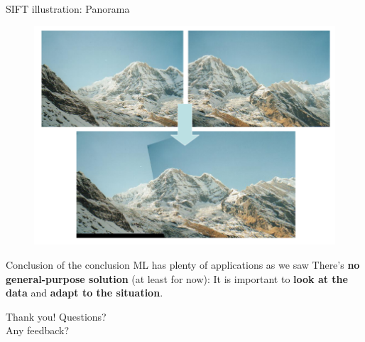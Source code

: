 \documentclass{beamer}
\newcommand{\1}[1]{\mathbbm{1}\left[#1\right]}
\begin{document}
\begin{frame}{SIFT illustration: Panorama}

\begin{figure}
\centering
\includegraphics[width=\textwidth]{images/sift_panorama_result.png}
\end{figure}
\end{frame}

\begin{frame}{Conclusion of the conclusion}
ML has plenty of applications as we saw
\pause
\vfill
There's \textbf{no general-purpose solution} (at least for now): It is important to \textbf{look at the data} and \textbf{adapt to the situation}.
\end{frame}

\begin{frame}
\begin{center}
\huge{Thank you! Questions? \\ Any feedback?}
\end{center}
\end{frame}
\end{document}
